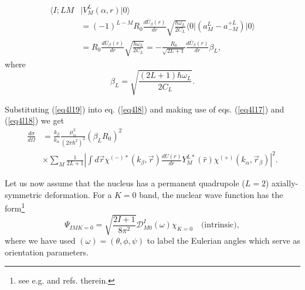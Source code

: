 \begin{subappendices}
\begin{equation}
\begin{split}
\langle  I;LM & \vert V^L_M (\alpha,r)\vert 0\rangle\\
&=(-1)^{L-M}R_0 \frac{d \bar U_\beta (r)}{d r} \sqrt{\frac{\hbar \omega_L}{2 C_L}}
\langle  0\vert(a_M^L-a^{+L}_{-M})\vert 0\rangle\\
& =R_0 \frac{d \bar U_\beta (r)}{d r} \sqrt{\frac{\hbar \omega_L}{2 C_L}}=
-\frac{R_0}{\sqrt{2L+1}} \frac{d \bar U_\beta (r)}{d r} \beta_L,
\end{split}
\end{equation}
where
\begin{equation}\label{eq4l20}
 \beta_L=\sqrt{\frac{(2L+1)\hbar \omega_L}{2 C_L}}.
\end{equation}


Substituting (\ref{eq4l19}) into eq. (\ref{eq4l8}) and making use of eqs. (\ref{eq4l17}) and (\ref{eq4l18}) we get
\begin{equation}\label{eq4l21}
\begin{split}
\frac{d\sigma}{d\Omega}&=\frac{k_\beta}{k_\alpha}\frac{\mu_\alpha^2}{(2 \pi \hbar^2)^2}(\beta_L R_0)^2\\
&\times\sum_{M}\frac{1}{2L+1}
\left\vert
\int d\vec r \chi^{(-)*}(k_\beta,\vec{r})
\frac{d  U (r)}{d r} Y_M^{L*}(\hat{r})\chi^{(+)}(k_\alpha,\vec{r}_\beta)\right\vert^2.
\end{split}
\end{equation}


Let us  now assume that the nucleus has a permanent quadrupole ($L=2$) axially-symmetric deformation. For a $K=0$ band, the nuclear wave function has the form\footnote{see e.g. \cite{Bohr:75} and refs. therein.}
\begin{equation}\label{eq4l22}
\Psi_{I M K=0} = \sqrt{\frac{2I+1}{8\pi^2}} \mathcal{D}_{M0}^I(\omega) \chi_{K=0} \quad \text{(intrinsic)},
\end{equation}
where we have used $(\omega)=(\theta,\phi,\psi)$ to label the Eulerian angles which serve as orientation parameters.



\end{subappendices}
